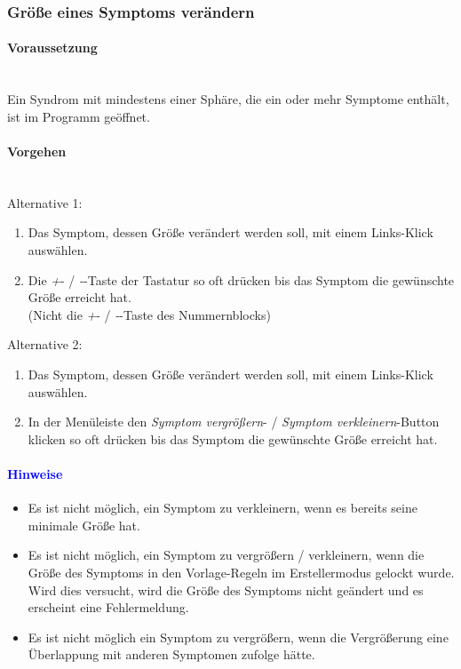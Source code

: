 \documentclass[enabledeprecatedfontcommands,fontsize=11pt,paper=a4,twoside]{scrartcl}
\newcommand*{\hint}{\paragraph{\textcolor{blue}{Hinweise}}}
\newcommand*{\condition}{\paragraph{Voraussetzung}$\;$ \vspace{0.2cm}\\}
\newcommand*{\actions}{\paragraph{Vorgehen} $\;$\vspace{0.2cm}\\}
\begin{document}
		\subsubsection{Größe eines Symptoms verändern}
					\condition 	
		Ein Syndrom mit mindestens einer Sphäre, die ein oder mehr Symptome enthält, ist im Programm geöffnet. 
		\actions
		Alternative 1:
		\begin{enumerate}
			\item Das Symptom, dessen Größe verändert werden soll, mit einem Links-Klick auswählen. 
			\item Die \glqq\textit{+}\grqq- / \glqq\textit{-}\grqq-Taste der Tastatur so oft drücken bis das Symptom die gewünschte Größe erreicht hat. \\
			(Nicht die  \glqq\textit{+}\grqq- / \glqq\textit{-}\grqq-Taste des Nummernblocks)
		\end{enumerate}
				Alternative 2:
		\begin{enumerate}
			\item Das Symptom, dessen Größe verändert werden soll, mit einem Links-Klick auswählen. 
			\item  In der Menüleiste den \textit{Symptom vergrößern}- / \textit{Symptom verkleinern}-Button klicken so oft drücken bis das Symptom die gewünschte Größe erreicht hat.
		\end{enumerate}
		\hint
		\begin{itemize}
			\item Es ist nicht möglich, ein Symptom zu verkleinern, wenn es bereits seine minimale Größe hat.
			\item Es ist nicht möglich, ein Symptom zu vergrößern  / verkleinern, wenn die Größe des Symptoms in den Vorlage-Regeln im Erstellermodus gelockt wurde. Wird dies versucht, wird die Größe des Symptoms nicht geändert und es erscheint eine Fehlermeldung.
			\item Es ist nicht möglich ein Symptom zu vergrößern, wenn die Vergrößerung eine Überlappung mit anderen Symptomen zufolge hätte.
		\end{itemize}
\end{document}
